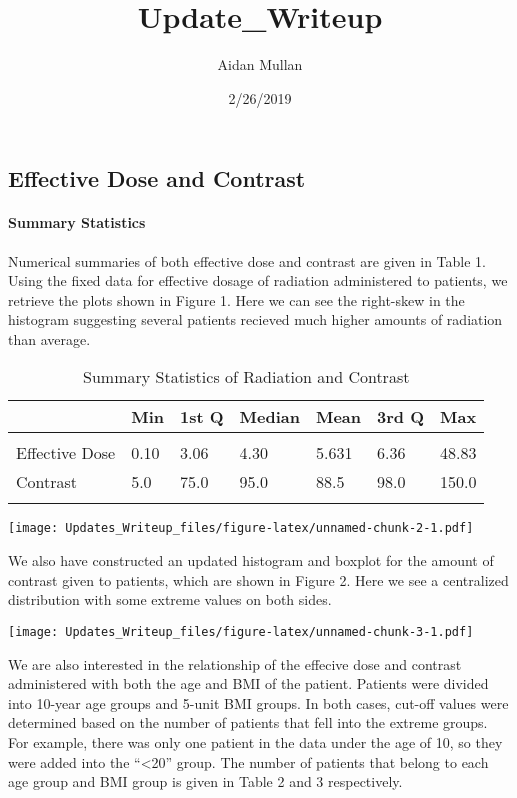 \documentclass[]{article}
\title{Update\_Writeup}
\author{Aidan Mullan}
\date{2/26/2019}
\let\oldparagraph\paragraph
\renewcommand{\paragraph}[1]{\oldparagraph{#1}\mbox{}}
\begin{document}
\maketitle

\subsection{Effective Dose and
Contrast}\label{effective-dose-and-contrast}

\paragraph{Summary Statistics}\label{summary-statistics}

Numerical summaries of both effective dose and contrast are given in
Table 1. Using the fixed data for effective dosage of radiation
administered to patients, we retrieve the plots shown in Figure 1. Here
we can see the right-skew in the histogram suggesting several patients
recieved much higher amounts of radiation than average.

\begin{table}[H] \centering 
  \caption{Summary Statistics of Radiation and Contrast} 
\begin{tabular}{p{3cm}p{1cm}p{1cm}p{1cm}p{1cm}p{1cm}p{1cm}}
\\[-1.8ex] \hline 
\hline
 & Min & 1st Q & Median & Mean & 3rd Q & Max \\ 
\hline \\[-1.8ex] 
Effective Dose & 0.10 & 3.06 & 4.30 & 5.631 & 6.36 & 48.83 \\
Contrast       & 5.0 & 75.0 & 95.0 & 88.5 & 98.0 & 150.0 \\
\hline 
\hline \\[-1.8ex]
 \end{tabular}
\end{table}

\texttt{[image: Updates\_Writeup\_files/figure-latex/unnamed-chunk-2-1.pdf]}

We also have constructed an updated histogram and boxplot for the amount
of contrast given to patients, which are shown in Figure 2. Here we see
a centralized distribution with some extreme values on both sides.

\texttt{[image: Updates\_Writeup\_files/figure-latex/unnamed-chunk-3-1.pdf]}

We are also interested in the relationship of the effecive dose and
contrast administered with both the age and BMI of the patient. Patients
were divided into 10-year age groups and 5-unit BMI groups. In both
cases, cut-off values were determined based on the number of patients
that fell into the extreme groups. For example, there was only one
patient in the data under the age of 10, so they were added into the
``\textless{}20'' group. The number of patients that belong to each age
group and BMI group is given in Table 2 and 3 respectively.
\end{document}
